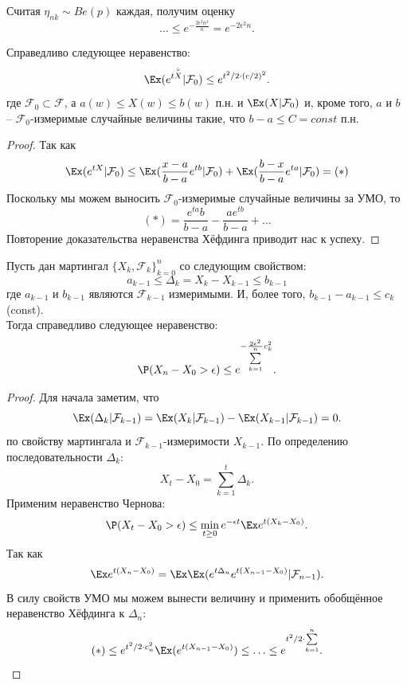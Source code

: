 Считая $\eta_{nk} \sim Be(p)$ каждая, получим оценку
\[
    \ldots \leq e^{-\frac{2\epsilon^2 n^2}{n}} = e^{-2\epsilon^2 n}.
\]
\begin{theorem}
    Справедливо следующее неравенство:
    \[
        \Ex (e^{t \overset{\circ}{X}}|\mathcal{F}_0) \leq e^{t^2/2 \cdot (c/2)^2}.
    \]
    где $\mathcal{F}_0 \subset \mathcal{F}$, а $a(w) \leq X(w) \leq b(w)$ п.н. и $\Ex (X |\mathcal{F}_0)$ и, кроме того,
    $a$ и $b$ -- $\mathcal{F}_0$-измеримые случайные величины такие, что $b - a \leq C = const$ п.н.
\end{theorem}
\begin{proof}
    Так как
    \[
        \Ex (e^{t X}|\mathcal{F}_0) \leq \Ex (\dfrac{x - a}{b - a}e^{tb}|\mathcal{F}_0) + \Ex (\dfrac{b - x}{b - a}e^{ta}|\mathcal{F}_0) = (*)
    \]
    Поскольку мы можем выносить $\mathcal{F}_0$-измеримые случайные величины за УМО, то
    \[
        (*) = \dfrac{e^{ta}b}{b - a} - \dfrac{a e^{tb}}{b - a} + \ldots
    \]
    Повторение доказательства неравенства Хёфдинга приводит нас к успеху.
\end{proof}
\begin{theorem}
    Пусть дан мартингал $\{X_k, \mathcal{F}_k\}_{k = 0}^n$ со следующим свойством:
    \[
        a_{k - 1} \leq \Delta_k = X_k - X_{k - 1} \leq b_{k - 1}
    \]
    где $a_{k - 1}$ и $b_{k - 1}$ являются $\mathcal{F}_{k - 1}$ измеримыми.
    И, более того, $b_{k - 1} - a_{k - 1} \leq c_{k}$ (const). \\
    Тогда справедливо следующее неравенство:
    \[
        \P(X_n - X_0 > \epsilon) \leq e^{-\frac{2\epsilon^2}{\sum\limits_{k = 1}^n} c^2_k}.
    \]
\end{theorem}
\begin{proof}
    Для начала заметим, что \[
                                \Ex(\Delta_k | \mathcal{F}_{k - 1}) = \Ex (X_{k}|\mathcal{F}_{k - 1}) - \Ex(X_{k - 1}|\mathcal{F}_{k - 1}) = 0.
    \]
    по свойству мартингала и $\mathcal{F}_{k - 1}$-измеримости $X_{k - 1}$.
    По определению последовательности $\Delta_k$:
    \[
        X_t - X_0 = \sum\limits_{k = 1}^{t} \Delta_k.
    \]
    Применим неравенство Чернова:
    \[
        \P(X_t - X_0 > \epsilon) \leq \min\limits_{t \geq 0} e^{-\epsilon t} \Ex e^{t(X_k - X_0)}.
    \]
    Так как
    \[
        \Ex e^{t(X_n - X_0)} = \Ex \Ex (e^{t \Delta_n}e^{t(X_{n - 1} - X_0)}|\mathcal{F}_{n - 1}).
    \]
    В силу свойств УМО мы можем вынести величину и применить обобщённое неравенство Хёфдинга к $\Delta_n$:
    \[
        (*) \leq e^{t^2/2 \cdot c_n^2} \Ex (e^{t(X_{n - 1} - X_0)}) \leq \ldots \leq e^{t^2/2 \cdot \sum\limits_{k = 1}^n}.
    \]
\end{proof}
